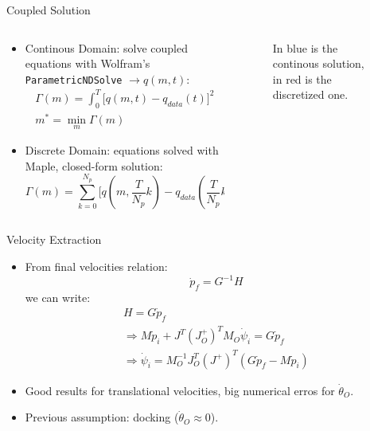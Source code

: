 \begin{frame}{Coupled Solution}
  \begin{columns}
    \begin{column}{0.5\textwidth}
      \begin{itemize}
        \item Continous Domain: solve coupled equations with Wolfram's \texttt{ParametricNDSolve} $\rightarrow q(m,t)$:
        \begin{equation}
          \begin{array}{c}
            \Gamma(m)=\int_{0}^{T}\Big[q(m,t)-q_{data}(t)\Big]^2\\
            m^*=\min_{m}\Gamma(m)
          \end{array}
        \end{equation}
        \item Discrete Domain: equations solved with Maple, closed-form solution:
        \begin{equation}
          \varGamma(m)=\sum_{k=0}^{N_p}\Big[q(m,\frac{T}{N_p}k)-q_{data}(\frac{T}{N_p}k)\Big]^2
        \end{equation}
      \end{itemize}
    \end{column}
    \begin{column}{0.5\textwidth}
      \begin{figure}
        \centering
        
        \caption{In blue is the continous solution, in red is the discretized one.}
      \end{figure}
    \end{column}
  \end{columns}
\end{frame}

\begin{frame}{Velocity Extraction}
  \begin{itemize}
    \item From final velocities relation:
    \begin{equation}
      \dot{p}_f=G^{-1}H
    \end{equation}
    we can write:
    \begin{equation}
      \begin{array}{l}
        H=G\dot{p}_f\\
        \Rightarrow M\dot{p}_i+J^T(J_O^+)^TM_O\dot{\psi}_i=G\dot{p}_f\\
        \Rightarrow \dot{\psi}_i=M_O^{-1}J_O^T(J^+)^T(G\dot{p}_f-M\dot{p}_i)
      \end{array}
    \end{equation}
    \item Good results for translational velocities, big numerical erros for $\dot{\theta}_O$.
    \item Previous assumption: docking ($\dot{\theta}_O\approx 0$).
  \end{itemize}
\end{frame}

